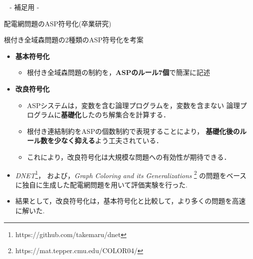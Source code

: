 \appendix
\backupbegin

\begin{frame}{~}
 \centering
 - 補足用 -
\end{frame} 

\begin{frame}{配電網問題のASP符号化(卒業研究)}
   \begin{block}{根付き全域森問題の2種類のASP符号化を考案}
     \begin{itemize}
     \item \alert{\bf 基本符号化}
       \begin{itemize}
       \item 根付き全域森問題の制約を，\textbf{ASPのルール7個}で簡潔に記述
       \end{itemize}
     \item \alert{\bf 改良符号化}
       \begin{itemize}
       \item ASPシステムは，変数を含む論理プログラムを，変数を含まない
         論理プログラムに\textbf{基礎化}したのち解集合を計算する．
       \item 根付き連結制約をASPの個数制約で表現することにより，
         \textbf{基礎化後のルール数を少なく抑える}よう工夫されている．
       \item これにより，改良符号化は大規模な問題への有効性が期待できる．
       \end{itemize}
     \end{itemize}
   \end{block}
 \begin{itemize}
  \renewcommand{\thefootnote}{\fnsymbol{footnote}}
  \setcounter{footnote}{1}
  \item \textit{DNET}\footnote{https://github.com/takemaru/dnet}，
        および，\textit{Graph Coloring and its Generalizations}
        \footnote{https://mat.tepper.cmu.edu/COLOR04/}%
        の問題をベースに独自に生成した配電網問題を用いて評価実験を行った.
  \item 結果として，改良符号化は，基本符号化と比較して，より多くの問題を高速に解いた.
 \end{itemize}
\end{frame}


